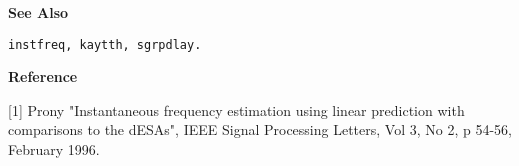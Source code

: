 
{\bf \large {}\selectfont See Also}\\
\hspace*{1.5cm}
\begin{minipage}[t]{13.5cm}
\begin{verbatim}
instfreq, kaytth, sgrpdlay.
\end{verbatim}
\end{minipage}
\vspace*{.5cm}


{\bf \large {}\selectfont Reference}\\
\hspace*{1.5cm}
\begin{minipage}[t]{13.5cm}
[1] Prony "Instantaneous frequency estimation using linear prediction with
	comparisons to the dESAs", IEEE Signal Processing Letters, Vol 3,
	No 2, p 54-56, February 1996.
\end{minipage}





